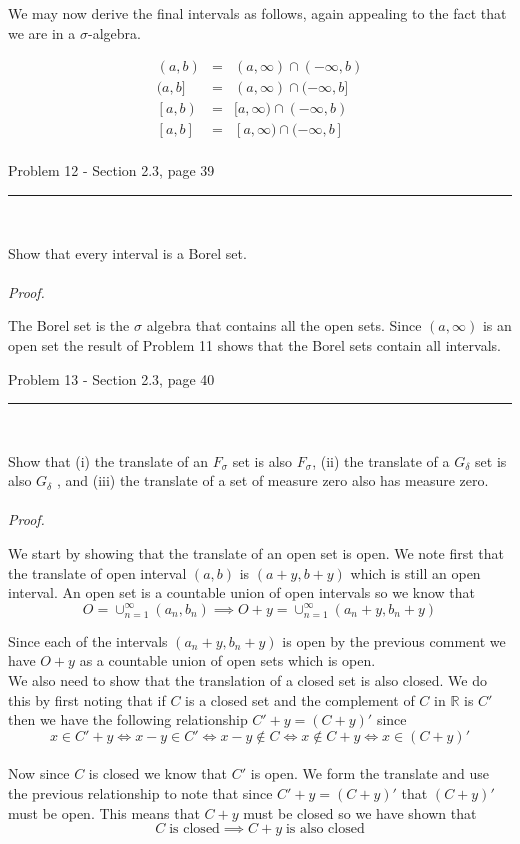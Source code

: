 \documentclass[11pt,reqno]{article}
\begin{document}
We may now derive the final intervals as follows, again appealing to the fact that we are in a $\sigma$-algebra.

\begin{eqnarray*}
(a, b) &=& (a, \infty) \cap (-\infty, b) \\
(a, b] &=& (a, \infty) \cap (-\infty, b] \\
\left[a, b\right) &=& [a, \infty) \cap (-\infty, b) \\
\left[a, b\right] &=& [a, \infty) \cap (-\infty, b] \\
\end{eqnarray*}


\begin{flushleft} 
Problem 12 - Section 2.3, page 39\\
\rule{500pt}{1pt}\\
\end{flushleft} 

Show that every interval is a Borel set.
\\\\ \emph{Proof.}

The Borel set is the $\sigma$ algebra that contains all the open sets. Since $(a, \infty)$ is an open set the result of Problem 11 shows that the Borel sets contain all intervals.

\begin{flushleft} 
Problem 13 - Section 2.3, page 40\\
\rule{500pt}{1pt}\\
\end{flushleft} 

Show that (i) the translate of an $F_\sigma$ set is also $F_\sigma$, (ii) the translate of a $G_\delta$ set is also $G_\delta$ , and (iii) the translate of a set of measure zero also has measure zero.
\\\\ \emph{Proof.}

We start by showing that the translate of an open set is open. We note first that the translate of open interval $(a,b)$ is $(a + y, b + y)$ which is still an open interval. An open set is a countable union of open intervals so we know that 
\[ O = \cup^\infty_{n = 1}(a_n, b_n) \implies  O + y = \cup^\infty_{n = 1}(a_n + y, b_n + y)  \]

Since each of the intervals $(a_n + y, b_n + y)$ is open by the previous comment we have $O +  y$ as a countable union of open sets which is open.\\
\indent We also need to show that the translation of a closed set is also closed. We do this by first noting that if $C$ is a closed set and the complement of $C$ in $\mathbb{R}$ is $C'$ then we have the following relationship $C' + y = (C + y)'$ since
\[ x \in C' + y \iff x - y \in C' \iff x- y \notin C \iff x \notin C + y \iff x \in (C + y)' \] \\
Now since $C$ is closed we know that $C'$ is open. We form the translate and use the previous relationship to note that since $C' + y = (C + y)'$ that $(C + y)'$ must be open. This means that $C+y$ must be closed so we have shown that 
\[ C \; \text{is closed} \implies C + y \; \text{is also closed} \]
\end{document}
